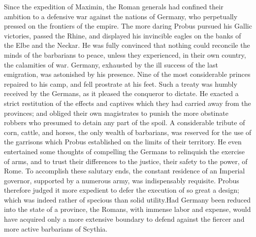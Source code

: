


Since the expedition of Maximin, the Roman generals had confined
their ambition to a defensive war against the nations of Germany,
who perpetually pressed on the frontiers of the empire. The more
daring Probus pursued his Gallic victories, passed the Rhine, and
displayed his invincible eagles on the banks of the Elbe and the
Neckar. He was fully convinced that nothing could reconcile the
minds of the barbarians to peace, unless they experienced, in
their own country, the calamities of war. Germany, exhausted by
the ill success of the last emigration, was astonished by his
presence. Nine of the most considerable princes repaired to his
camp, and fell prostrate at his feet. Such a treaty was humbly
received by the Germans, as it pleased the conqueror to dictate.
He exacted a strict restitution of the effects and captives which
they had carried away from the provinces; and obliged their own
magistrates to punish the more obstinate robbers who presumed to
detain any part of the spoil. A considerable tribute of corn,
cattle, and horses, the only wealth of barbarians, was reserved
for the use of the garrisons which Probus established on the
limits of their territory. He even entertained some thoughts of
compelling the Germans to relinquish the exercise of arms, and to
trust their differences to the justice, their safety to the
power, of Rome. To accomplish these salutary ends, the constant
residence of an Imperial governor, supported by a numerous army,
was indispensably requisite. Probus therefore judged it more
expedient to defer the execution of so great a design; which was
indeed rather of specious than solid utility.\footnotemark[40] Had Germany been
reduced into the state of a province, the Romans, with immense
labor and expense, would have acquired only a more extensive
boundary to defend against the fiercer and more active barbarians
of Scythia.


